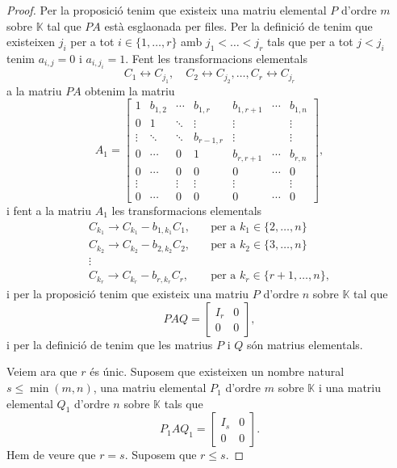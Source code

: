 \documentclass[../../Main.tex]{subfiles}
\begin{document}
\begin{theorem}
\begin{proof}
			Per la proposició  tenim que existeix una matriu elemental \(P\) d'ordre \(m\) sobre \(\mathbb{K}\) tal que \(PA\) està esglaonada per files. Per la definició de  tenim que existeixen \(j_{i}\) per a tot \(i\in\{1,\dots,r\}\) amb \(j_{1}<\dots<j_{r}\) tals que per a tot \(j<j_{i}\) tenim \(a_{i,j}=0\) i \(a_{i,j_{i}}=1\). Fent les transformacions elementals
			\[
			    C_{1}\leftrightarrow C_{j_{1}},\quad C_{2}\leftrightarrow C_{j_{2}},\dots,C_{r}\leftrightarrow C_{j_{r}}
			\]
			a la matriu \(PA\) obtenim la matriu
			\[A_{1}=\left[\begin{array}{cccc|ccc}
			1 & b_{1,2} & \cdots & b_{1,r} & b_{1,r+1} & \cdots & b_{1,n} \\
			0 & 1 & \ddots & \vdots & \vdots & & \vdots\\
			\vdots & \ddots & \ddots & b_{r-1,r} & \vdots & & \vdots \\
			0 & \cdots & 0 & 1 & b_{r,r+1} & \cdots & b_{r,n} \\\hline
			0 & \cdots & 0 & 0 & 0 & \cdots & 0 \\
			\vdots & & \vdots & \vdots & \vdots & & \vdots \\
			0 & \cdots & 0 & 0 & 0 & \cdots & 0
			\end{array}\right],\]
			i fent a la matriu \(A_{1}\) les transformacions elementals
			\begin{align*}
			C_{k_{1}}\rightarrow C_{k_{1}}-b_{1,k_{1}}C_{1},\quad&\text{per a }k_{1}\in\{2,\dots,n\} \\
			C_{k_{2}}\rightarrow C_{k_{2}}-b_{2,k_{2}}C_{2},\quad&\text{per a }k_{2}\in\{3,\dots,n\} \\
			\vdots & \\
			C_{k_{r}}\rightarrow C_{k_{r}}-b_{r,k_{r}}C_{r},\quad&\text{per a }k_{r}\in\{r+1,\dots,n\},
			\end{align*}
			i per la proposició  tenim que existeix una matriu \(P\) d'ordre \(n\) sobre \(\mathbb{K}\) tal que
			\[PAQ=\left[\begin{array}{c|c}
			I_{r} & 0\\\hline
			0 & 0
			\end{array}\right],\]
			i per la definició de  tenim que les matrius \(P\) i \(Q\) són matrius elementals. %
			
			Veiem ara que \(r\) és únic. Suposem que existeixen un nombre natural \(s\leq\min(m,n)\), una matriu elemental \(P_{1}\) d'ordre \(m\) sobre \(\mathbb{K}\) i una matriu elemental \(Q_{1}\) d'ordre \(n\) sobre \(\mathbb{K}\) tals que
			\[P_{1}AQ_{1}=\left[\begin{array}{c|c}
			I_{s} & 0\\\hline
			0 & 0
			\end{array}\right].\]
			Hem de veure que \(r=s\). Suposem que \(r\leq s\).
			

\end{proof}
\end{theorem}
\end{document}
